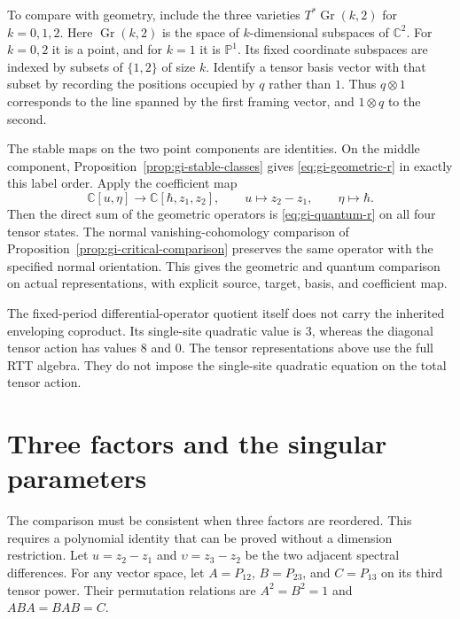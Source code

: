 To compare with geometry, include the three varieties $T^*\operatorname{Gr}(k,2)$ for $k=0,1,2$.
Here $\operatorname{Gr}(k,2)$ is the space of $k$-dimensional subspaces of $\mathbb C^2$.
For $k=0,2$ it is a point, and for $k=1$ it is $\mathbb P^1$.
Its fixed coordinate subspaces are indexed by subsets of $\{1,2\}$ of size $k$.
Identify a tensor basis vector with that subset by recording the positions occupied by $q$ rather than $1$.
Thus $q\otimes1$ corresponds to the line spanned by the first framing vector, and $1\otimes q$ to the second.

The stable maps on the two point components are identities.
On the middle component, Proposition~\ref{prop:gi-stable-classes} gives \eqref{eq:gi-geometric-r} in exactly this label order.
Apply the coefficient map
\[
 \mathbb C[u,\eta]\longrightarrow\mathbb C[\hbar,z_1,z_2],
 \qquad u\longmapsto z_2-z_1,\qquad\eta\longmapsto\hbar.
\]
Then the direct sum of the geometric operators is \eqref{eq:gi-quantum-r} on all four tensor states.
The normal vanishing-cohomology comparison of Proposition~\ref{prop:gi-critical-comparison} preserves the same operator with the specified normal orientation.
This gives the geometric and quantum comparison on actual representations, with explicit source, target, basis, and coefficient map.

The fixed-period differential-operator quotient itself does not carry the inherited enveloping coproduct.
Its single-site quadratic value is $3$, whereas the diagonal tensor action has values $8$ and $0$.
The tensor representations above use the full RTT algebra.
They do not impose the single-site quadratic equation on the total tensor action.

\section{Three factors and the singular parameters}

The comparison must be consistent when three factors are reordered.
This requires a polynomial identity that can be proved without a dimension restriction.
Let $u=z_2-z_1$ and $\upsilon=z_3-z_2$ be the two adjacent spectral differences.
For any vector space, let $A=P_{12}$, $B=P_{23}$, and $C=P_{13}$ on its third tensor power.
Their permutation relations are
$A^2=B^2=1$ and $ABA=BAB=C$.


